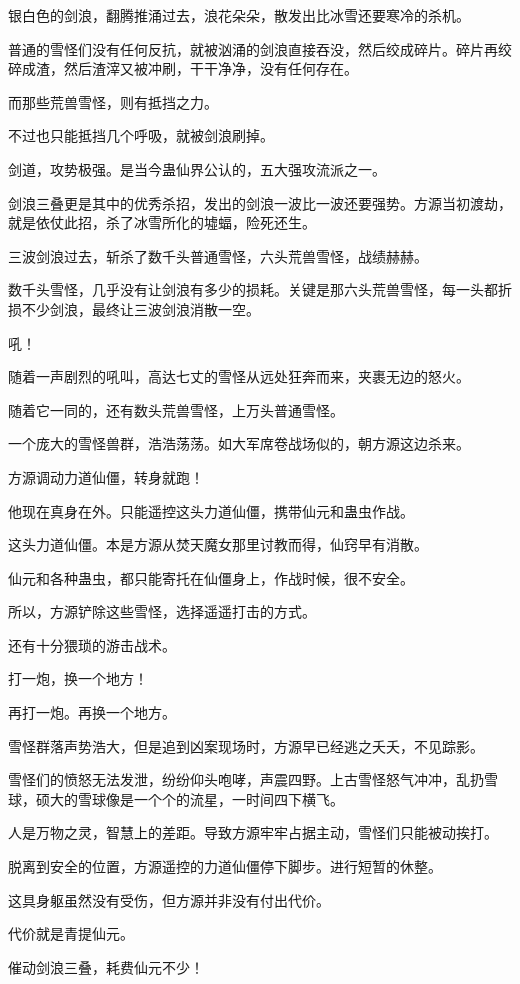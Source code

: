 \begin{this_body}
银白色的剑浪，翻腾推涌过去，浪花朵朵，散发出比冰雪还要寒冷的杀机。

普通的雪怪们没有任何反抗，就被汹涌的剑浪直接吞没，然后绞成碎片。碎片再绞碎成渣，然后渣滓又被冲刷，干干净净，没有任何存在。

而那些荒兽雪怪，则有抵挡之力。

不过也只能抵挡几个呼吸，就被剑浪刷掉。

剑道，攻势极强。是当今蛊仙界公认的，五大强攻流派之一。

剑浪三叠更是其中的优秀杀招，发出的剑浪一波比一波还要强势。方源当初渡劫，就是依仗此招，杀了冰雪所化的墟蝠，险死还生。

三波剑浪过去，斩杀了数千头普通雪怪，六头荒兽雪怪，战绩赫赫。

数千头雪怪，几乎没有让剑浪有多少的损耗。关键是那六头荒兽雪怪，每一头都折损不少剑浪，最终让三波剑浪消散一空。

吼！

随着一声剧烈的吼叫，高达七丈的雪怪从远处狂奔而来，夹裹无边的怒火。

随着它一同的，还有数头荒兽雪怪，上万头普通雪怪。

一个庞大的雪怪兽群，浩浩荡荡。如大军席卷战场似的，朝方源这边杀来。

方源调动力道仙僵，转身就跑！

他现在真身在外。只能遥控这头力道仙僵，携带仙元和蛊虫作战。

这头力道仙僵。本是方源从焚天魔女那里讨教而得，仙窍早有消散。

仙元和各种蛊虫，都只能寄托在仙僵身上，作战时候，很不安全。

所以，方源铲除这些雪怪，选择遥遥打击的方式。

还有十分猥琐的游击战术。

打一炮，换一个地方！

再打一炮。再换一个地方。

雪怪群落声势浩大，但是追到凶案现场时，方源早已经逃之夭夭，不见踪影。

雪怪们的愤怒无法发泄，纷纷仰头咆哮，声震四野。上古雪怪怒气冲冲，乱扔雪球，硕大的雪球像是一个个的流星，一时间四下横飞。

人是万物之灵，智慧上的差距。导致方源牢牢占据主动，雪怪们只能被动挨打。

脱离到安全的位置，方源遥控的力道仙僵停下脚步。进行短暂的休整。

这具身躯虽然没有受伤，但方源并非没有付出代价。

代价就是青提仙元。

催动剑浪三叠，耗费仙元不少！


\end{this_body}
